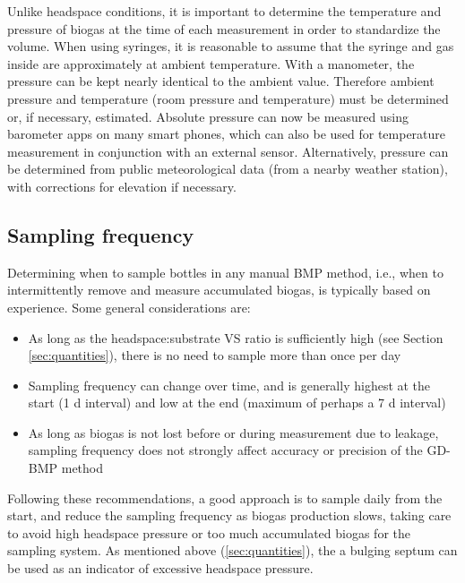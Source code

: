 \documentclass[]{article}
\begin{document}
Unlike headspace conditions, it is important to determine the temperature and pressure of biogas at the time of each measurement in order to standardize the volume.
When using syringes, it is reasonable to assume that the syringe and gas inside are approximately at ambient temperature.
With a manometer, the pressure can be kept nearly identical to the ambient value.
Therefore ambient pressure and temperature (room pressure and temperature) must be determined or, if necessary, estimated.
Absolute pressure can now be measured using barometer apps on many smart phones, which can also be used for temperature measurement in conjunction with an external sensor.
Alternatively, pressure can be determined from public meteorological data (from a nearby weather station), with corrections for elevation if necessary.

\subsection{Sampling frequency}
\label{sec:freq}

Determining when to sample bottles in any manual BMP method, i.e., when to intermittently remove and measure accumulated biogas, is typically based on experience. 
Some general considerations are:
\begin{itemize}
	\item As long as the headspace:substrate VS ratio is sufficiently high (see Section \ref{sec:quantities}), there is no need to sample more than once per day
  \item Sampling frequency can change over time, and is generally highest at the start (1 d interval) and low at the end (maximum of perhaps a 7 d interval)
  \item As long as biogas is not lost before or during measurement due to leakage, sampling frequency does not strongly affect accuracy or precision of the GD-BMP method
\end{itemize}

Following these recommendations, a good approach is to sample daily from the start, and reduce the sampling frequency as biogas production slows, taking care to avoid high headspace pressure or too much accumulated biogas for the sampling system.
As mentioned above (\ref{sec:quantities}), the a bulging septum can be used as an indicator of excessive headspace pressure.
\end{document}
